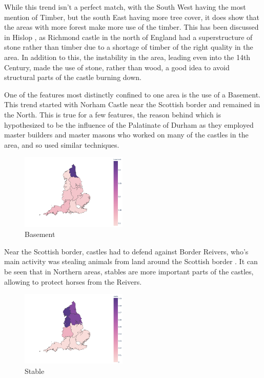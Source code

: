 \documentclass[11pt]{article}
\begin{document}
While this trend isn't a perfect match, with the South West having the most mention of Timber, but the south East having more tree cover, it does show that the areas with more forest make more use of the timber. This has been discussed in Hislop \cite{HislopMalcolm2016Cb:a}, as Richmond castle in the north of England had a superstructure of stone rather than timber due to a shortage of timber of the right quality in the area. In addition to this, the instability in the area, leading even into the 14th Century, made the use of stone, rather than wood, a good idea to avoid structural parts of the castle burning down.

One of the features most distinctly confined to one area is the use of a Basement. This trend started with Norham Castle near the Scottish border \cite{HislopMalcolm2016Cb:a} and remained in the North. This is true for a few features, the reason behind which is hypothesized to be the influence of the Palatinate of Durham \cite[p6]{HislopMalcolm2016Cb:a} as they employed master builders and master masons who worked on many of the castles in the area, and so used similar techniques.

\begin{figure}[H]
	\centering
	\includegraphics[width=0.45\textwidth]{basement.png}
	\caption{Basement}
\end{figure}



Near the Scottish border, castles had to defend against Border Reivers, who's main activity was stealing animals from land around the Scottish border \cite{moffat2011reivers}. It can be seen that in Northern areas, stables are more important parts of the castles, allowing to protect horses from the Reivers.

\begin{figure}[H]
	\centering
	\includegraphics[width=0.45\textwidth]{stable.png}
	\caption{Stable}
\end{figure}
\end{document}
